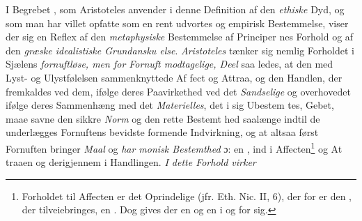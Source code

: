 I Begrebet , som Aristoteles anvender i denne
Definition af den \emph{ethiske} Dyd, og som man har villet opfatte
som en rent udvortes og empirisk Bestemmelse, viser der sig
en Reflex af den \emph{metaphysiske} Bestemmelse af Principer\-%
nes Forhold og af den \emph{græske idealistiske Grundansku\-%
else}. \emph{Aristoteles} tænker sig nemlig Forholdet i Sjælens
\emph{fornuftløse, men for Fornuft modtagelige, Deel} saa\-%
ledes, at den med Lyst- og Ulystfølelsen sammenknyttede Af\-%
fect og Attraa, og den Handlen, der fremkaldes ved dem, ifølge
 \setcounter{footnote}{0}
deres Paavirkethed ved det \emph{Sandselige} og overhovedet ifølge
deres Sammenhæng med det \emph{Materielles}, det i sig Ubestem\-%
tes, Gebet, maae savne den sikkre \emph{Norm} og den rette Bestemt\-%
hed saalænge indtil de underlægges Fornuftens bevidste formende
Indvirkning, og at altsaa først Fornuften bringer \emph{Maal} og \emph{har\-%
monisk Bestemthed} ɔ: en , ind i Affecten\footnote{Forholdet
til Affecten er det Oprindelige (jfr. Eth. Nic. II, 6), der\-%
for er den , der tilveiebringes, en . Dog gives der en  og en  i og for sig.}
og At\-%
traaen og derigjennem i Handlingen. \emph{I dette Forhold virker}
